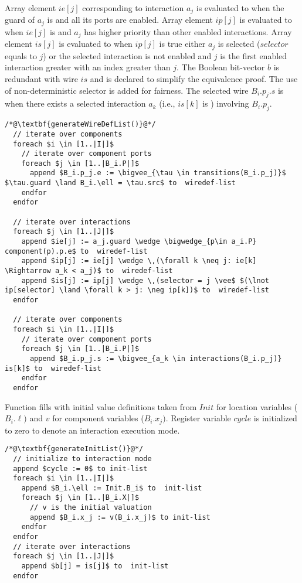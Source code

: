 Array element $ie[j]$ corresponding to interaction $a_j$ is evaluated to \true when the guard of $a_j$ is \true and all its ports are enabled. Array element $ip[j]$ is evaluated to \true when $ie[j]$ is \true and $a_j$ has higher priority than other enabled interactions. 
Array element $is[j]$ is evaluated to \true when $ip[j]$ is true either $a_j$ is selected ($selector$ equals to $j$) or the selected interaction is not enabled and $j$ is the first enabled interaction greater with an index greater than $j$. 
The Boolean bit-vector $b$ is redundant with wire $is$ and is declared to simplify the equivalence proof. 
The use of non-deterministic selector is added for fairness. 
The selected wire $B_i.p_j.s$ is \true when there exists a selected interaction $a_k$ (i.e., $is[k]$ is \true) involving $B_i.p_j$.
\begin{widetext}
\begin{lstlisting}
/*@\textbf{generateWireDefList()}@*/
  // iterate over components
  foreach $i \in [1..|I|]$ 
    // iterate over component ports
    foreach $j \in [1..|B_i.P|]$ 
      append $B_i.p_j.e := \bigvee_{\tau \in transitions(B_i.p_j)}$ $\tau.guard \land B_i.\ell = \tau.src$ to  wiredef-list 
    endfor
  endfor
  
  // iterate over interactions
  foreach $j \in [1..|J|]$ 
    append $ie[j] := a_j.guard \wedge \bigwedge_{p\in a_i.P} component(p).p.e$ to  wiredef-list 
    append $ip[j] := ie[j] \wedge \,(\forall k \neq j: ie[k] \Rightarrow a_k < a_j)$ to  wiredef-list 
    append $is[j] := ip[j] \wedge \,(selector = j \vee$ $(\lnot ip[selector] \land \forall k > j: \neg ip[k])$ to  wiredef-list 
  endfor
  
  // iterate over components
  foreach $i \in [1..|I|]$ 
    // iterate over component ports
    foreach $j \in [1..|B_i.P|]$ 
      append $B_i.p_j.s := \bigvee_{a_k \in interactions(B_i.p_j)} is[k]$ to  wiredef-list 
    endfor
  endfor
\end{lstlisting}
\end{widetext}

Function  fills  with initial value definitions taken from $Init$ for location variables ($B_i.\ell)$ and $v$ for component variables ($B_i.x_j)$. Register variable $cycle$ is initialized to zero to denote an interaction execution mode. 

\begin{lstlisting}
/*@\textbf{generateInitList()}@*/
  // initialize to interaction mode
  append $cycle := 0$ to init-list 
  foreach $i \in [1..|I|]$
    append $B_i.\ell := Init.B_i$ to  init-list 
    foreach $j \in [1..|B_i.X|]$
      // v is the initial valuation
      append $B_i.x_j := v(B_i.x_j)$ to init-list  
    endfor
  endfor
  // iterate over interactions
  foreach $j \in [1..|J|]$ 
    append $b[j] = is[j]$ to  init-list 
  endfor
\end{lstlisting}

